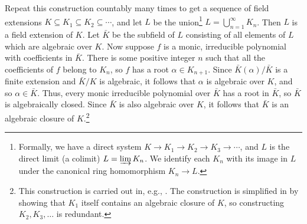 \begin{solution}
Repeat this construction countably many times to get a sequence of field extensions \(K \subseteq K_1 \subseteq K_2 \subseteq \cdots\), and let \(L\) be the union\footnote{%
Formally, we have a direct system \(K \to K_1 \to K_2 \to K_3 \to \cdots\), and \(L\) is the direct limit (a colimit) \(L = \varinjlim K_n\).
We identify each \(K_n\) with its image in \(L\) under the canonical ring homomorphism \(K_n \to L\).
}
\(L = \bigcup_{n=1}^\infty K_n\).
Then \(L\) is a field extension of \(K\).
Let \(\bar{K}\) be the subfield of \(L\) consisting of all elements of \(L\) which are algebraic over \(K\).
Now suppose \(f\) is a monic, irreducible polynomial with coefficients in \(\bar{K}\).
There is some positive integer \(n\) such that all the coefficients of \(f\) belong to \(K_n\), so \(f\) has a root \(\alpha \in K_{n+1}\).
Since \(\bar{K}(\alpha) / \bar{K}\) is a finite extension and \(\bar{K} / K\) is algebraic, it follows that \(\alpha\) is algebraic over \(K\), and so \(\alpha \in \bar{K}\).
Thus, every monic irreducible polynomial over \(\bar{K}\) has a root in \(\bar{K}\), so \(\bar{K}\) is algebraically closed.
Since \(\bar{K}\) is also algebraic over \(K\), it follows that \(\bar{K}\) is an algebraic closure of \(K\).\footnote{%
This construction is carried out in, e.g., \cite[Chapter~V, Theorem~2.5 and Corollary~2.6]{LangAlgebra}.
The construction is simplified in \cite{GilmerAlgebraicClosure} by showing that \(K_1\) itself contains an algebraic closure of \(K\), so constructing \(K_2, K_3, \ldots\) is redundant.
}%
\end{solution}